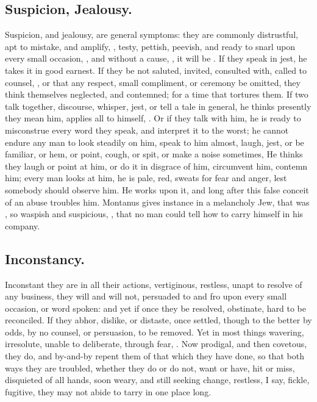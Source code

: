 {\subsection{Suspicion, Jealousy.}
Suspicion, and jealousy, are general symptoms: they are commonly distrustful,
apt to mistake, and amplify, ,
testy, pettish, peevish, and ready to snarl upon every
small occasion, , and without a cause,
, it will be . If they speak in
jest, he takes it in good earnest. If they be not saluted, invited, consulted
with, called to counsel, \etc{}, or that any respect, small compliment, or
ceremony be omitted, they think themselves neglected, and contemned; for a time
that tortures them. If two talk together, discourse, whisper, jest, or tell a
tale in general, he thinks presently they mean him, applies all to himself,
. Or if they talk with him, he is ready to
misconstrue every word they speak, and interpret it to the worst; he cannot
endure any man to look steadily on him, speak to him almost, laugh, jest, or be
familiar, or hem, or point, cough, or spit, or make a noise sometimes, \etc{}
He thinks they laugh or point at him, or do it in disgrace
of him, circumvent him, contemn him; every man looks at him, he is pale, red,
sweats for fear and anger, lest somebody should observe him. He works upon it,
and long after this false conceit of an abuse troubles him. Montanus
 gives instance in a melancholy Jew, that was
, so waspish and suspicious, , that
no man could tell how to carry himself in his company.

\subsection{Inconstancy.}
Inconstant they are in all their actions, vertiginous, restless, unapt to
resolve of any business, they will and will not, persuaded to and fro upon
every small occasion, or word spoken: and yet if once they be resolved,
obstinate, hard to be reconciled. If they abhor, dislike, or distaste, once
settled, though to the better by odds, by no counsel, or persuasion, to be
removed. Yet in most things wavering, irresolute, unable to deliberate, through
fear, . Now prodigal, and then covetous, they do, and by-and-by repent them
of that which they have done, so that both ways they are troubled, whether they
do or do not, want or have, hit or miss, disquieted of all hands, soon weary,
and still seeking change, restless, I say, fickle, fugitive, they may not abide
to tarry in one place long.

}
